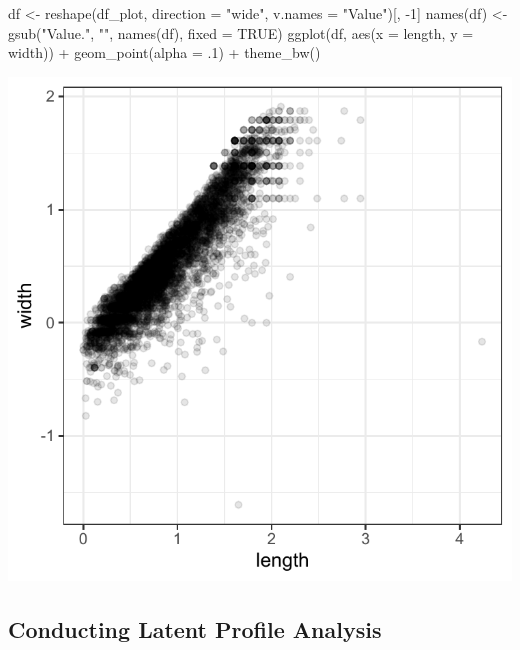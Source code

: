 \documentclass[
  man,floatsintext]{apa6}
\newenvironment{Shaded}{\begin{snugshade}}{\end{snugshade}}
\newcommand{\AttributeTok}[1]{\textcolor[rgb]{0.77,0.63,0.00}{#1}}
\newcommand{\ConstantTok}[1]{\textcolor[rgb]{0.00,0.00,0.00}{#1}}
\newcommand{\DecValTok}[1]{\textcolor[rgb]{0.00,0.00,0.81}{#1}}
\newcommand{\FunctionTok}[1]{\textcolor[rgb]{0.00,0.00,0.00}{#1}}
\newcommand{\NormalTok}[1]{#1}
\newcommand{\OtherTok}[1]{\textcolor[rgb]{0.56,0.35,0.01}{#1}}
\newcommand{\SpecialCharTok}[1]{\textcolor[rgb]{0.00,0.00,0.00}{#1}}
\newcommand{\StringTok}[1]{\textcolor[rgb]{0.31,0.60,0.02}{#1}}
\begin{document}
\begin{Shaded}
\begin{Highlighting}[]
\NormalTok{df }\OtherTok{\textless{}{-}} \FunctionTok{reshape}\NormalTok{(df\_plot, }\AttributeTok{direction =} \StringTok{"wide"}\NormalTok{, }\AttributeTok{v.names =} \StringTok{"Value"}\NormalTok{)[, }\SpecialCharTok{{-}}\DecValTok{1}\NormalTok{]}
\FunctionTok{names}\NormalTok{(df) }\OtherTok{\textless{}{-}} \FunctionTok{gsub}\NormalTok{(}\StringTok{"Value."}\NormalTok{, }\StringTok{""}\NormalTok{, }\FunctionTok{names}\NormalTok{(df), }\AttributeTok{fixed =} \ConstantTok{TRUE}\NormalTok{)}
\FunctionTok{ggplot}\NormalTok{(df, }\FunctionTok{aes}\NormalTok{(}\AttributeTok{x =}\NormalTok{ length, }\AttributeTok{y =}\NormalTok{ width)) }\SpecialCharTok{+}
  \FunctionTok{geom\_point}\NormalTok{(}\AttributeTok{alpha =}\NormalTok{ .}\DecValTok{1}\NormalTok{) }\SpecialCharTok{+}
  \FunctionTok{theme\_bw}\NormalTok{()}
\end{Highlighting}
\end{Shaded}

\includegraphics{appendices/plot_gmm_scatter.pdf}

\hypertarget{conducting-latent-profile-analysis}{%
\subsection{Conducting Latent Profile Analysis}\label{conducting-latent-profile-analysis}}
\end{document}
